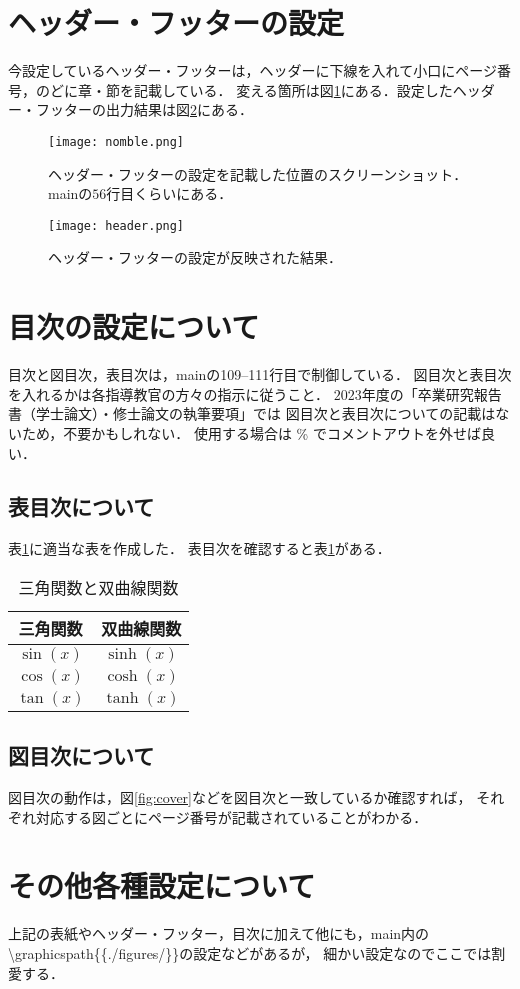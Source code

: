 \section{ヘッダー・フッターの設定}
今設定しているヘッダー・フッターは，ヘッダーに下線を入れて小口にページ番号，のどに章・節を記載している．
変える箇所は図\ref{fig:nomble}にある．設定したヘッダー・フッターの出力結果は図\ref{fig:header}にある．

\begin{figure}[h]
  \centering
  \texttt{[image: nomble.png]}
  \caption{ヘッダー・フッターの設定を記載した位置のスクリーンショット．mainの$56$行目くらいにある．}
  \label{fig:nomble}
\end{figure}
\begin{figure}[h]
  \centering
  \texttt{[image: header.png]}
  \caption{ヘッダー・フッターの設定が反映された結果．}
  \label{fig:header}
\end{figure}


\section{目次の設定について}
目次と図目次，表目次は，mainの109--111行目で制御している．
図目次と表目次を入れるかは各指導教官の方々の指示に従うこと．
$2023$年度の「卒業研究報告書（学士論文）・修士論文の執筆要項」では
図目次と表目次についての記載はないため，不要かもしれない．
使用する場合は \% でコメントアウトを外せば良い．

\subsection{表目次について}
表\ref{tab:triangle}に適当な表を作成した．
表目次を確認すると表\ref{tab:triangle}がある．

\begin{table}[htbp]
  \centering
  \caption{三角関数と双曲線関数}
  \begin{tabular}{cc} \toprule 
    三角関数 & 双曲線関数 \\ \hline
    $\sin(x)$ & $\sinh(x)$ \\
    $\cos(x)$ & $\cosh(x)$ \\
    $\tan(x)$ & $\tanh(x)$ \\ \hline
  \end{tabular}
  \label{tab:triangle}
\end{table}


\subsection{図目次について}
図目次の動作は，図\ref{fig:cover}などを図目次と一致しているか確認すれば，
それぞれ対応する図ごとにページ番号が記載されていることがわかる．


\section{その他各種設定について}
上記の表紙やヘッダー・フッター，目次に加えて他にも，main内の
\textbackslash graphicspath\{\{./figures/\}\}の設定などがあるが，
細かい設定なのでここでは割愛する．